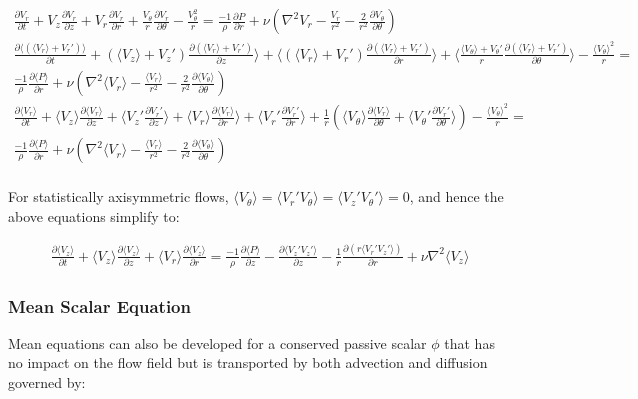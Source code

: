 \documentclass[10pt]{article}
\newcommand{\beqa}{\begin{equation}\begin{aligned}}
\newcommand{\eeqa}{\end{aligned}\end{equation}}
\newcommand{\la}{\langle}
\newcommand{\ra}{\rangle}
\begin{document}
\begin{flushleft}
\beqa
\frac{\partial V_r}{\partial t}+V_z\frac{\partial V_r}{\partial z}+V_r\frac{\partial V_r}{\partial r}+\frac{V_{\theta}}{r}\frac{\partial V_r}{\partial\theta}-\frac{V_{\theta}^2}{r}=\frac{-1}{\rho}\frac{\partial P}{\partial r}+\nu\left(\nabla^2 V_r-\frac{V_r}{r^2}-\frac{2}{r^2}\frac{\partial V_{\theta}}{\partial\theta}\right)\\
\frac{\partial \la(\la V_r\ra + V_r')\ra}{\partial t}+(\la V_z\ra+V_z')\frac{\partial (\la V_r\ra + V_r')}{\partial z}\ra+\la(\la V_r\ra + V_r')\frac{\partial (\la V_r\ra + V_r')}{\partial r}\ra+\la\frac{\la V_{\theta}\ra+V_{\theta}'}{r}\frac{\partial (\la V_r\ra + V_r')}{\partial\theta}\ra-\frac{\la V_{\theta}\ra^2}{r}=\\
\frac{-1}{\rho}\frac{\partial \la P\ra}{\partial r}+\nu\left(\nabla^2 \la V_r\ra-\frac{\la V_r\ra}{r^2}-\frac{2}{r^2}\frac{\partial \la V_{\theta}\ra}{\partial\theta}\right)\\
\frac{\partial \la V_r\ra}{\partial t}+\la V_z\ra\frac{\partial \la V_r\ra}{\partial z}+\la V_z'\frac{\partial V_r'}{\partial z}\ra+\la V_r\ra\frac{\partial\la V_r\ra}{\partial r}\ra+\la V_r'\frac{\partial V_r'}{\partial r}\ra+\frac{1}{r}\left(\la V_{\theta}\ra\frac{\partial \la V_r\ra}{\partial\theta}+\la V_{\theta}'\frac{\partial V_r'}{\partial\theta}\ra\right)-\frac{\la V_{\theta}\ra^2}{r}=\\
\frac{-1}{\rho}\frac{\partial \la P\ra}{\partial r}+\nu\left(\nabla^2 \la V_r\ra-\frac{\la V_r\ra}{r^2}-\frac{2}{r^2}\frac{\partial \la V_{\theta}\ra}{\partial\theta}\right)\\
\eeqa

For statistically axisymmetric flows, \(\la V_{\theta}\ra=\la V_r'V_{\theta}\ra=\la V_z'V_{\theta}'\ra=0\), and hence the above equations simplify to:

\beqa
\frac{\partial \la V_z\ra}{\partial t}+\la V_z\ra\frac{\partial \la V_z\ra}{\partial z}+\la V_r\ra\frac{\partial \la V_z\ra}{\partial r}=\frac{-1}{\rho}\frac{\partial \la P\ra}{\partial z}-\frac{\partial \la V_z'V_z'\ra}{\partial z}-\frac{1}{r}\frac{\partial (r\la V_r'V_z'\ra)}{\partial r}+\nu\nabla^2\la V_z\ra
\eeqa





\subsubsection{Mean Scalar Equation}
Mean equations can also be developed for a conserved passive scalar \(\phi\) that has no impact on the flow field but is transported by both advection and diffusion governed by:


\end{flushleft}
\end{document}
